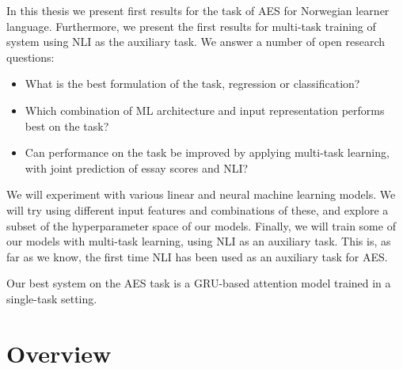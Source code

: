 In this thesis we present first results for the task of \ac{AES} for
Norwegian learner language. Furthermore, we present the first results for
multi-task training of  system using \ac{NLI} as the auxiliary task.
We answer a number of open research questions:

\begin{itemize}
    \item What is the best formulation of the task, regression or
        classification?
    \item Which combination of \ac{ML} architecture and input representation
        performs best on the task?
    \item Can performance on the task be improved by applying multi-task
        learning, with joint prediction of essay scores and \ac{NLI}?
\end{itemize}

We will experiment with various linear and neural machine learning models. We
will try using different input features and combinations of these, and
explore a subset of the hyperparameter space of our models. Finally, we will
train some of our models with multi-task learning, using \ac{NLI} as an
auxiliary task. This is, as far as we know, the first time \ac{NLI} has been
used as an auxiliary task for \ac{AES}.

Our best system on the AES task is a GRU-based attention model trained in a
single-task setting.


\section{Overview}


